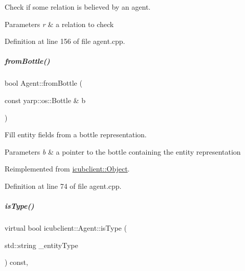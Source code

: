 Check if some relation is believed by an agent. 


\begin{DoxyParams}{Parameters}
{\em r} & a relation to check \\
\hline
\end{DoxyParams}


Definition at line 156 of file agent.\+cpp.

\mbox{\label{group__icubclient__representations_abee6123159a9c2d01cd0f6609c8e3415}} 
\subparagraph{\texorpdfstring{from\+Bottle()}{fromBottle()}}
{\footnotesize\ttfamily bool Agent\+::from\+Bottle (\begin{DoxyParamCaption}\item[{const yarp\+::os\+::\+Bottle \&}]{b }\end{DoxyParamCaption})\hspace{0.3cm}{\ttfamily [virtual]}}



Fill entity fields from a bottle representation. 


\begin{DoxyParams}{Parameters}
{\em b} & a pointer to the bottle containing the entity representation \\
\hline
\end{DoxyParams}


Reimplemented from \hyperlink{group__icubclient__representations_ab5662af99b6bfa7d3996192c62536bf1}{icubclient\+::\+Object}.



Definition at line 74 of file agent.\+cpp.

\mbox{\label{group__icubclient__representations_a0ec60560ae6d20bffb64ce9aa6339894}} 
\subparagraph{\texorpdfstring{is\+Type()}{isType()}}
{\footnotesize\ttfamily virtual bool icubclient\+::\+Agent\+::is\+Type (\begin{DoxyParamCaption}\item[{std\+::string}]{\+\_\+entity\+Type }\end{DoxyParamCaption}) const\hspace{0.3cm}{\ttfamily [inline]}, {\ttfamily [virtual]}}



